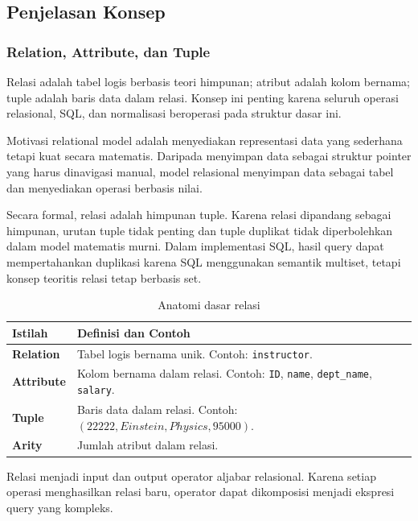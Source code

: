 \subsection{Penjelasan Konsep}

\subsubsection{Relation, Attribute, dan Tuple}

\begin{jawab}
Relasi adalah tabel logis berbasis teori himpunan; atribut adalah kolom bernama; tuple adalah baris data dalam relasi. Konsep ini penting karena seluruh operasi relasional, SQL, dan normalisasi beroperasi pada struktur dasar ini.
\end{jawab}

Motivasi relational model adalah menyediakan representasi data yang sederhana tetapi kuat secara matematis. Daripada menyimpan data sebagai struktur pointer yang harus dinavigasi manual, model relasional menyimpan data sebagai tabel dan menyediakan operasi berbasis nilai.

Secara formal, relasi adalah himpunan tuple. Karena relasi dipandang sebagai himpunan, urutan tuple tidak penting dan tuple duplikat tidak diperbolehkan dalam model matematis murni. Dalam implementasi SQL, hasil query dapat mempertahankan duplikasi karena SQL menggunakan semantik multiset, tetapi konsep teoritis relasi tetap berbasis set.

\begin{table}[H]
\centering
\begin{tabularx}{\textwidth}{|L{0.22\textwidth}|X|}
\hline
\textbf{Istilah} & \textbf{Definisi dan Contoh} \\
\hline
\textbf{Relation} & Tabel logis bernama unik. Contoh: \texttt{instructor}. \\
\hline
\textbf{Attribute} & Kolom bernama dalam relasi. Contoh: \texttt{ID}, \texttt{name}, \texttt{dept\_name}, \texttt{salary}. \\
\hline
\textbf{Tuple} & Baris data dalam relasi. Contoh: \((22222, Einstein, Physics, 95000)\). \\
\hline
\textbf{Arity} & Jumlah atribut dalam relasi. \\
\hline
\end{tabularx}
\caption{Anatomi dasar relasi}
\label{tab:relation-anatomy}
\end{table}

Relasi menjadi input dan output operator aljabar relasional. Karena setiap operasi menghasilkan relasi baru, operator dapat dikomposisi menjadi ekspresi query yang kompleks.

